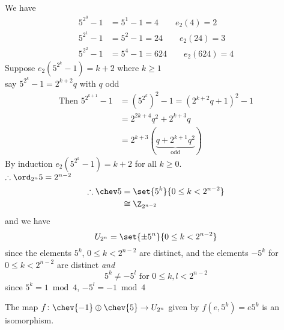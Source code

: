 We have
\begin{align*}
5^{2^0}-1 &= 5^1-1 = 4 \qquad e_2(4)=2 \\
5^{2^1}-1 &= 5^2-1 = 24 \qquad e_2(24)=3 \\
5^{2^2}-1 &= 5^4-1 = 624 \qquad e_2(624)=4
\end{align*}
Suppose $e_2(5^{2^k}-1)=k+2$ where $k\geq1$ \\
say $5^{2^k}-1=2^{k+2}q$ with $q$ odd
\begin{align*}
\text{Then }5^{2^{k+1}}-1 &= (5^{2^k})^2-1 = (2^{k+2}q+1)^2 -1 \\
&= 2^{2k+4}q^2 + 2^{k+3}q \\
&= 2^{k+3}(\underbrace{q+2^{k+1}q^2}_{\text{odd}}) 
\end{align*}
By induction $e_2(5^{2^k}-1)=k+2$ for all $k\geq0$. \\
$\therefore\ord_{2^n}5=2^{n-2}$
\begin{align*}
\therefore\chev5 &= \set{5^k}{0\leq k<2^{n-2}} \\
&\cong \Z_{2^{n-2}}
\end{align*}
and we have
\[ U_{2^n} = \set{\pm5^n}{0\leq k<2^{n-2}} \]
since the elements $5^{k}$, $0\leq k<2^{n-2}$ are distinct, and the elements $-5^k$ for $0\leq k<2^{n-2}$ are distinct \emph{and}
\[ 5^k \neq -5^l \text{ for } 0\leq k,l<2^{n-2} \]
since $5^k=1\bmod4$, $-5^l=-1\bmod4$

The map $f\colon\chev{-1}\oplus\chev{5}\to U_{2^n}$ given by $f(e,5^k)=e5^k$ is an isomorphism.
